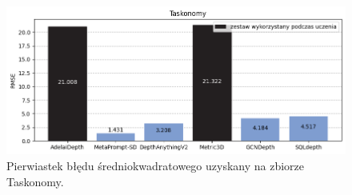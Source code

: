 \begin{figure}[H]
    \centering
    \includegraphics{plots/rmse/6}
    \caption{Pierwiastek błędu średniokwadratowego uzyskany na zbiorze Taskonomy.}
    \label{fig:rmse_6}
\end{figure}


